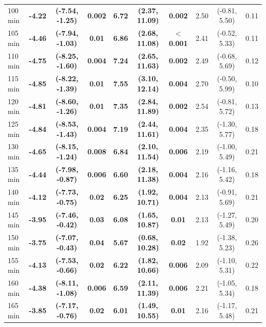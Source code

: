 \begin{table}[ht]
{\begin{tabular}{lccccccccc}
100 min & \textbf{-4.22} & \textbf{(-7.54, -1.25)} & \textbf{0.002} & \textbf{6.72} & \textbf{(2.37, 11.09)} & \textbf{0.002} & 2.50 & (-0.81, 5.50) & 0.11 \\
105 min & \textbf{-4.46} & \textbf{(-7.94, -1.03)} & \textbf{0.01} & \textbf{6.86} & \textbf{(2.68, 11.08)} & \textbf{$<$0.001} & 2.41 & (-0.52, 5.33) & 0.11 \\
110 min & \textbf{-4.75} & \textbf{(-8.25, -1.60)} & \textbf{0.004} & \textbf{7.24} & \textbf{(2.65, 11.63)} & \textbf{0.002} & 2.49 & (-0.68, 5.69) & 0.12 \\
115 min & \textbf{-4.85} & \textbf{(-8.22, -1.39)} & \textbf{0.01} & \textbf{7.55} & \textbf{(3.10, 12.14)} & \textbf{0.004} & 2.70 & (-0.50, 5.99) & 0.10 \\
120 min & \textbf{-4.81} & \textbf{(-8.60, -1.26)} & \textbf{0.01} & \textbf{7.35} & \textbf{(2.84, 11.89)} & \textbf{0.002} & 2.54 & (-0.81, 5.72) & 0.13 \\
125 min & \textbf{-4.84} & \textbf{(-8.53, -1.43)} & \textbf{0.004} & \textbf{7.19} & \textbf{(2.44, 11.61)} & \textbf{0.004} & 2.35 & (-1.30, 5.77) & 0.18 \\
130 min & \textbf{-4.65} & \textbf{(-8.15, -1.24)} & \textbf{0.008} & \textbf{6.84} & \textbf{(2.10, 11.54)} & \textbf{0.006} & 2.19 & (-1.00, 5.49) & 0.21 \\
135 min & \textbf{-4.44} & \textbf{(-7.98, -0.87)} & \textbf{0.006} & \textbf{6.60} & \textbf{(2.18, 11.38)} & \textbf{0.004} & 2.16 & (-1.16, 5.42) & 0.18 \\
140 min & \textbf{-4.12} & \textbf{(-7.73, -0.75)} & \textbf{0.02} & \textbf{6.25} & \textbf{(1.92, 10.71)} & \textbf{0.004} & 2.13 & (-0.91, 5.69) & 0.21 \\
145 min & \textbf{-3.95} & \textbf{(-7.46, -0.42)} & \textbf{0.03} & \textbf{6.08} & \textbf{(1.65, 10.87)} & \textbf{0.01} & 2.13 & (-1.27, 5.49) & 0.20 \\
150 min & \textbf{-3.75} & \textbf{(-7.07, -0.43)} & \textbf{0.04} & \textbf{5.67} & \textbf{(0.68, 10.28)} & \textbf{0.02} & 1.92 & (-1.38, 5.23) & 0.26 \\
155 min & \textbf{-4.13} & \textbf{(-7.53, -0.66)} & \textbf{0.02} & \textbf{6.22} & \textbf{(1.82, 10.66)} & \textbf{0.006} & 2.09 & (-1.10, 5.31) & 0.22 \\
160 min & \textbf{-4.38} & \textbf{(-8.11, -1.08)} & \textbf{0.006} & \textbf{6.59} & \textbf{(2.11, 11.39)} & \textbf{0.006} & 2.21 & (-1.05, 5.34) & 0.18 \\
165 min & \textbf{-3.85} & \textbf{(-7.17, -0.76)} & \textbf{0.02} & \textbf{6.01} & \textbf{(1.49, 10.55)} & \textbf{0.01} & 2.16 & (-1.17, 5.48) & 0.21 \\

\end{tabular}}
\end{table}
